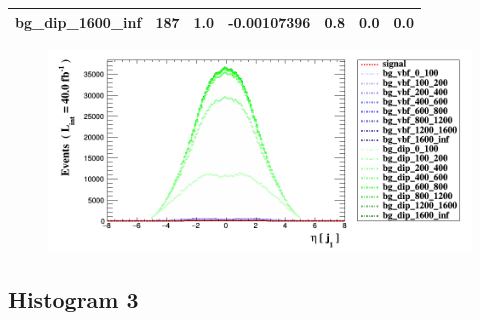 \documentclass[a4paper, 10pt]{article}
\begin{document}
\begin{table}[H]
\begin{center}
\begin{tabular}{|m{23.0mm}|m{23.0mm}|m{18.0mm}|m{19.0mm}|m{19.0mm}|m{19.0mm}|m{19.0mm}|}
      \hline
      {\cellcolor{white}         bg\_dip\_1600\_inf}& {\cellcolor{white}         187}& {\cellcolor{white}         1.0}& {\cellcolor{white}         -0.00107396}& {\cellcolor{white}         0.8}& {\cellcolor{green}         0.0}& {\cellcolor{green}         0.0}\\
\hline
    \end{tabular}
  \end{center}
\end{table}

\begin{figure}[H]
  \begin{center}
    \includegraphics[scale=0.45]{selection_1.png}\\
\caption{   }
  \end{center}
\end{figure}
      \newpage
\subsection{ Histogram 3}
\end{document}
